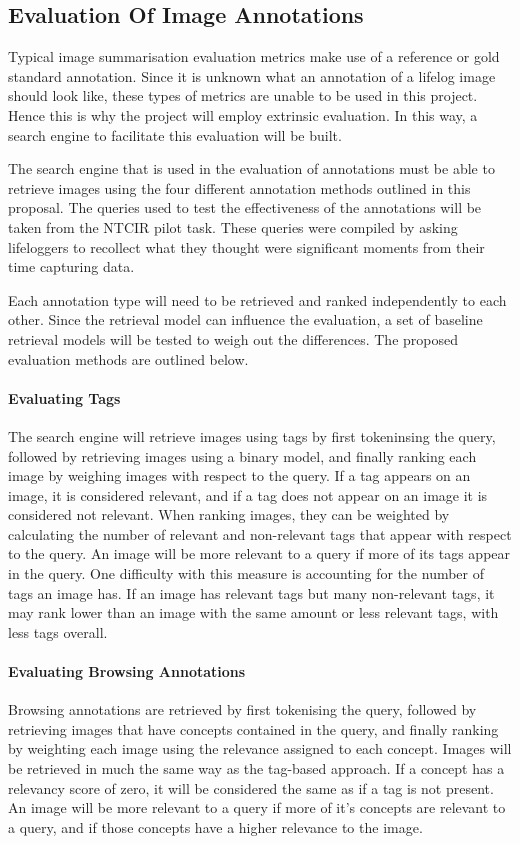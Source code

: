 \documentclass[12pt,a4paper]{article}
\begin{document}
\subsection{Evaluation Of Image Annotations}
Typical image summarisation evaluation metrics make use of a reference or gold standard annotation. Since it is unknown what an annotation of a lifelog image should look like, these types of metrics are unable to be used in this project. Hence this is why the project will employ extrinsic evaluation. In this way, a search engine to facilitate this evaluation will be built.

The search engine that is used in the evaluation of annotations must be able to retrieve images using the four different annotation methods outlined in this proposal. The queries used to test the effectiveness of the annotations will be taken from the NTCIR pilot task. These queries were compiled by asking lifeloggers to recollect what they thought were significant moments from their time capturing data.

Each annotation type will need to be retrieved and ranked independently to each other. Since the retrieval model can influence the evaluation, a set of baseline retrieval models will be tested to weigh out the differences. The proposed evaluation methods are outlined below.

\paragraph{Evaluating Tags}
The search engine will retrieve images using tags by first tokeninsing the query, followed by retrieving images using a binary model, and finally ranking each image by weighing images with respect to the query. If a tag appears on an image, it is considered relevant, and if a tag does not appear on an image it is considered not relevant. When ranking images, they can be weighted by calculating the number of relevant and non-relevant tags that appear with respect to the query. An image will be more relevant to a query if more of its tags appear in the query. One difficulty with this measure is accounting for the number of tags an image has. If an image has relevant tags but many non-relevant tags, it may rank lower than an image with the same amount or less relevant tags, with less tags overall.

\paragraph{Evaluating Browsing Annotations}
Browsing annotations are retrieved by first tokenising the query, followed by retrieving images that have concepts contained in the query, and finally ranking by weighting each image using the relevance assigned to each concept. Images will be retrieved in much the same way as the tag-based approach. If a concept has a relevancy score of zero, it will be considered the same as if a tag is not present. An image will be more relevant to a query if more of it's concepts are relevant to a query, and if those concepts have a higher relevance to the image.
\end{document}
